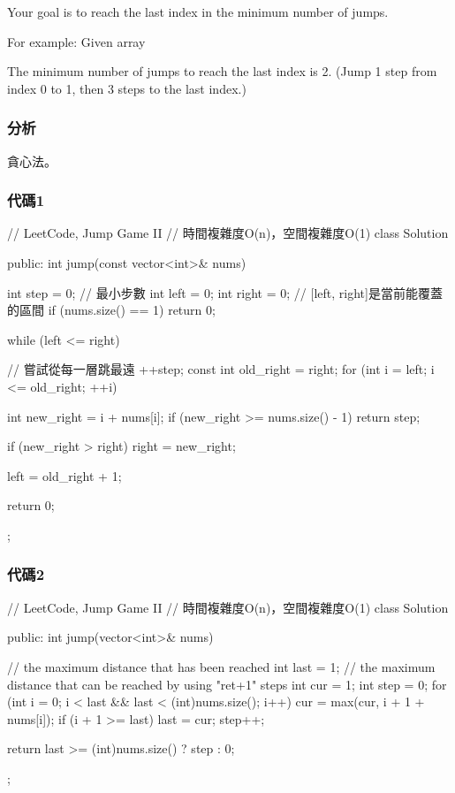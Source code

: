 Your goal is to reach the last index in the minimum number of jumps.

For example:
Given array 

The minimum number of jumps to reach the last index is 2. (Jump 1 step from index 0 to 1, then 3 steps to the last index.)


\subsubsection{分析}
貪心法。


\subsubsection{代碼1}
\begin{Code}
// LeetCode, Jump Game II
// 時間複雜度O(n)，空間複雜度O(1)
class Solution {
public:
    int jump(const vector<int>& nums) {
        int step = 0; // 最小步數
        int left = 0;
        int right = 0;  // [left, right]是當前能覆蓋的區間
        if (nums.size() == 1) return 0;

        while (left <= right) { // 嘗試從每一層跳最遠
            ++step;
            const int old_right = right;
            for (int i = left; i <= old_right; ++i) {
                int new_right = i + nums[i];
                if (new_right >= nums.size() - 1) return step;

                if (new_right > right) right = new_right;
            }
            left = old_right + 1;
        }
        return 0;
    }
};
\end{Code}


\subsubsection{代碼2}
\begin{Code}
// LeetCode, Jump Game II
// 時間複雜度O(n)，空間複雜度O(1)
class Solution {
public:
    int jump(vector<int>& nums) {
        // the maximum distance that has been reached
        int last = 1;
        // the maximum distance that can be reached by using "ret+1" steps
        int cur = 1;
        int step = 0;
        for (int i = 0; i < last && last < (int)nums.size(); i++) {
            cur = max(cur, i + 1 + nums[i]);
            if (i + 1 >= last) {
                last = cur;
                step++;
            }
        }

        return last >= (int)nums.size() ? step : 0;
    }
};
\end{Code}


